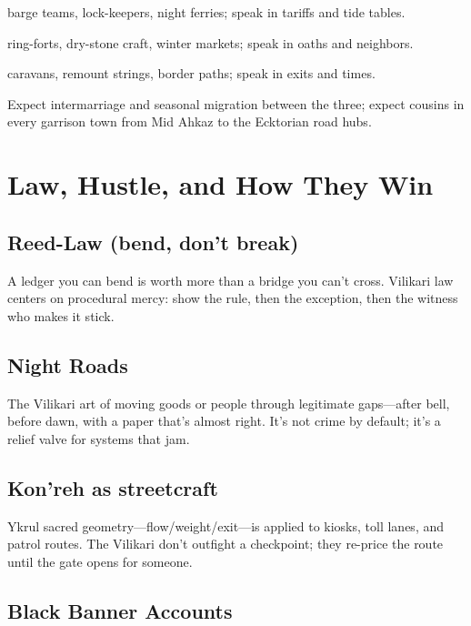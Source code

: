 \documentclass[11pt,letterpaper]{article}
\begin{document}
\begin{description}[leftmargin=*, labelwidth=2cm]
\item[Reed-House (rivers)] barge teams, lock-keepers, night ferries; speak in tariffs and tide tables.
\item[Stone-House (hills)] ring-forts, dry-stone craft, winter markets; speak in oaths and neighbors.
\item[Road-House (camps)] caravans, remount strings, border paths; speak in exits and times.
\end{description}

Expect intermarriage and seasonal migration between the three; expect cousins in every garrison town from Mid Ahkaz to the Ecktorian road hubs.

\section{Law, Hustle, and How They Win}

\subsection{Reed-Law (bend, don't break)}

A ledger you can bend is worth more than a bridge you can't cross. Vilikari law centers on procedural mercy: show the rule, then the exception, then the witness who makes it stick.

\subsection{Night Roads}

The Vilikari art of moving goods or people through legitimate gaps---after bell, before dawn, with a paper that's almost right. It's not crime by default; it's a relief valve for systems that jam.

\subsection{Kon'reh as streetcraft}

Ykrul sacred geometry---flow/weight/exit---is applied to kiosks, toll lanes, and patrol routes. The Vilikari don't outfight a checkpoint; they re-price the route until the gate opens for someone.

\subsection{Black Banner Accounts}
\end{document}
